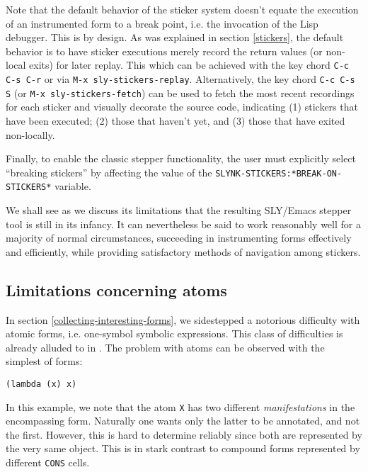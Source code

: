 \documentclass[sigconf]{acmart}
\begin{document}
Note that the default behavior of the sticker system doesn't equate
the execution of an instrumented form to a break point, i.e. the
invocation of the Lisp debugger.  This is by design.  As was explained
in section \ref{stickers}, the default behavior is to have sticker
executions merely record the return values (or non-local exits) for
later replay.  This which can be achieved with the key chord
\texttt{C-c C-s C-r} or via \texttt{M-x sly-stickers-replay}.
Alternatively, the key chord \texttt{C-c C-s S} (or \texttt{M-x
  sly-stickers-fetch}) can be used to fetch the most recent recordings
for each sticker and visually decorate the source code, indicating (1)
stickers that have been executed; (2) those that haven't yet, and (3)
those that have exited non-locally.

Finally, to enable the classic stepper functionality, the user must
explicitly select ``breaking stickers'' by affecting the value of the
\texttt{SLYNK-STICKERS:*BREAK-ON-STICKERS*} variable.

We shall see as we discuss its limitations that the resulting
SLY/Emacs stepper tool is still in its infancy.  It can nevertheless
be said to work reasonably well for a majority of normal
circumstances, succeeding in instrumenting forms effectively and
efficiently, while providing satisfactory methods of navigation among
stickers.

\subsection{Limitations concerning atoms}\label{atoms}

In section \ref{collecting-interesting-forms}, we sidestepped a
notorious difficulty with atomic forms, i.e. one-symbol symbolic
expressions.  This class of difficulties is already alluded to in
\cite[I-4.8]{annotation-based}.  The problem with atoms can be
observed with the simplest of forms:

\begin{verbatim}
(lambda (x) x)
\end{verbatim}

In this example, we note that the atom \texttt{X} has two different
\emph{manifestations} in the encompassing form.  Naturally one wants
only the latter to be annotated, and not the first.  However, this is
hard to determine reliably since both are represented by the very same
object.  This is in stark contrast to compound forms represented by
different \texttt{CONS} cells.
\end{document}

